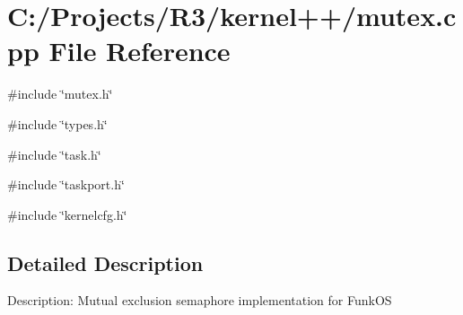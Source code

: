 \section{C:/Projects/R3/kernel++/mutex.cpp File Reference}
\label{mutex_8cpp}
{\ttfamily \#include \char`\"{}mutex.h\char`\"{}}\par
{\ttfamily \#include \char`\"{}types.h\char`\"{}}\par
{\ttfamily \#include \char`\"{}task.h\char`\"{}}\par
{\ttfamily \#include \char`\"{}taskport.h\char`\"{}}\par
{\ttfamily \#include \char`\"{}kernelcfg.h\char`\"{}}\par


\subsection{Detailed Description}
Description: Mutual exclusion semaphore implementation for FunkOS 